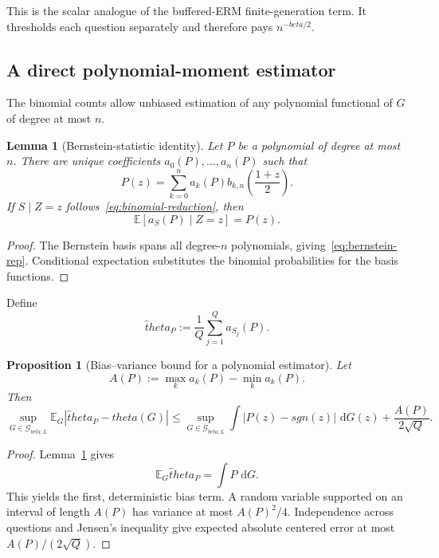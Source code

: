 \documentclass[11pt]{article}
\def\beta{beta}%
\def\theta{theta}%
\def\sgn{sgn}%
\newtheorem{proposition}[theorem]{Proposition}
\newtheorem{lemma}[theorem]{Lemma}
\newcommand{\E}{\mathbb E}
\newcommand{\sgn}{\operatorname{sgn}}
\newcommand{\calG}{\mathcal G}
\newcommand{\dd}{\,\mathrm d}
\begin{document}
This is the scalar analogue of the buffered-ERM finite-generation term.  It thresholds each question separately and therefore pays $n^{-\beta/2}$.

\subsection{A direct polynomial-moment estimator}

The binomial counts allow unbiased estimation of any polynomial functional of $G$ of degree at most $n$.

\begin{lemma}[Bernstein-statistic identity]
\label{lem:bernstein-statistic}
Let $P$ be a polynomial of degree at most $n$.  There are unique coefficients $a_0(P),\dots,a_n(P)$ such that
\begin{equation}
\label{eq:bernstein-rep}
P(z)
=
\sum_{k=0}^n a_k(P)
 b_{k,n}\left(\frac{1+z}{2}\right).
\end{equation}
If $S\mid Z=z$ follows~\eqref{eq:binomial-reduction}, then
\[
\E[a_S(P)\mid Z=z]=P(z).
\]
\end{lemma}

\begin{proof}
The Bernstein basis spans all degree-$n$ polynomials, giving~\eqref{eq:bernstein-rep}.  Conditional expectation substitutes the binomial probabilities for the basis functions.
\end{proof}

Define
\[
\widehat\theta_P
:=
\frac1Q\sum_{j=1}^Q a_{S_j}(P).
\]

\begin{proposition}[Bias--variance bound for a polynomial estimator]
\label{prop:poly-estimator}
Let
\[
A(P):=\max_k a_k(P)-\min_k a_k(P).
\]
Then
\begin{equation}
\label{eq:poly-bv}
\sup_{G\in\calG_{\beta,L}}
\E_G|\widehat\theta_P-\theta(G)|
\le
\sup_{G\in\calG_{\beta,L}}
\int|P(z)-\sgn(z)|\,\dd G(z)
+
\frac{A(P)}{2\sqrt Q}.
\end{equation}
\end{proposition}

\begin{proof}
Lemma~\ref{lem:bernstein-statistic} gives
\[
\E_G\widehat\theta_P=\int P\,\dd G.
\]
This yields the first, deterministic bias term.  A random variable supported on an interval of length $A(P)$ has variance at most $A(P)^2/4$.  Independence across questions and Jensen's inequality give expected absolute centered error at most $A(P)/(2\sqrt Q)$.
\end{proof}
\end{document}
